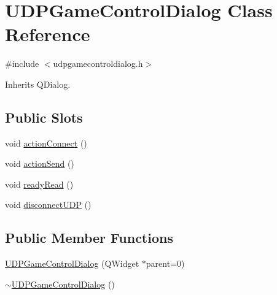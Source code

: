 \hypertarget{class_u_d_p_game_control_dialog}{\section{U\-D\-P\-Game\-Control\-Dialog Class Reference}
\label{class_u_d_p_game_control_dialog}
}


{\ttfamily \#include $<$udpgamecontroldialog.\-h$>$}



Inherits Q\-Dialog.

\subsection*{Public Slots}
\begin{DoxyCompactItemize}
\item 
void \hyperlink{class_u_d_p_game_control_dialog_a1c523cbdc885c04c8cb56c7af53fe139}{action\-Connect} ()
\item 
void \hyperlink{class_u_d_p_game_control_dialog_a11157b7b269dfb45dfd28dbd1a8cf79a}{action\-Send} ()
\item 
void \hyperlink{class_u_d_p_game_control_dialog_a4319f4c1e839dda7fc3031dc83de7b1d}{ready\-Read} ()
\item 
void \hyperlink{class_u_d_p_game_control_dialog_a6e90f68418822def16d80a0b276c1b93}{disconnect\-U\-D\-P} ()
\end{DoxyCompactItemize}
\subsection*{Public Member Functions}
\begin{DoxyCompactItemize}
\item 
\hyperlink{class_u_d_p_game_control_dialog_af90706165a534cd8d17314290c370543}{U\-D\-P\-Game\-Control\-Dialog} (Q\-Widget $\ast$parent=0)
\item 
\hyperlink{class_u_d_p_game_control_dialog_a7543ff4d3aac8e184d445ac66f904816}{$\sim$\-U\-D\-P\-Game\-Control\-Dialog} ()
\end{DoxyCompactItemize}


